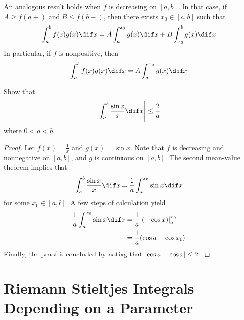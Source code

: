 \documentclass[thmcnt=section, color=blue, 12pt]{my-elegantbook}
\begin{document}
An analogous result holds when $f$ is decreasing on $[a, b]$.
In that case, if $A \geq f(a+)$ and $B \leq f(b-)$, then
there exists $x_0 \in [a, b]$ such that
\begin{align*}
	\int_a^b f(x) g(x) \dif x
	= A \int_a^{x_0} g(x) \dif x
	+ B \int_{x_0}^b g(x) \dif x
\end{align*}
In particular, if $f$ is nonpositive, then
\begin{align*}
	\int_a^b f(x) g(x) \dif x
	= A \int_a^{x_0} g(x) \dif x
\end{align*}

\begin{exercise}
	Show that
	\begin{align*}
		\abs{\int_a^b \frac{\sin x}{x} \dif x} \leq \frac{2}{a}
	\end{align*}
	where $0 < a < b$.
\end{exercise}

\begin{proof}
	Let $f(x) = \frac{1}{x}$ and $g(x) = \sin x$.
	Note that $f$ is decreasing and nonnegative on $[a, b]$,
	and $g$ is continuous on $[a, b]$.
	The second mean-value theorem implies that
	\begin{align*}
		\int_a^b \frac{\sin x}{x} \dif x
		= \frac{1}{a} \int_a^{x_0} \sin x \dif x
	\end{align*}
	for some $x_0 \in [a, b]$.
	A few steps of calculation yield
	\begin{align*}
		\frac{1}{a} \int_a^{x_0} \sin x \dif x
		 & = \frac{1}{a} \left . (-\cos x) \right\rvert_{a}^{x_0} \\
		 & = \frac{1}{a} (\cos a - \cos x_0)
	\end{align*}
	Finally, the proof is concluded by noting that $\left\lvert \cos a - \cos x \right\rvert \leq 2$.
\end{proof}




\section{Riemann Stieltjes Integrals Depending on a Parameter}
\end{document}
